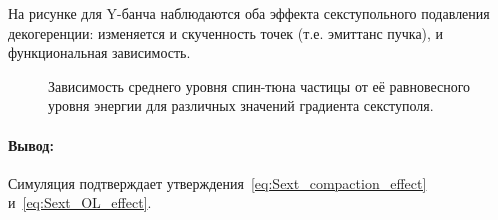 На рисунке для Y-банча наблюдаются оба эффекта секступольного подавления декогеренции: изменяется и скученность точек (т.е. эмиттанс пучка), и функциональная зависимость.

\begin{figure}[h]
	\centering
	\caption{Зависимость среднего уровня спин-тюна частицы от её равновесного уровня энергии для различных значений градиента секступоля.\label{fig:ST_vs_dkok_for_sext_strenghts}}
\end{figure}

\paragraph{Вывод:} Симуляция подтверждает утверждения~\eqref{eq:Sext_compaction_effect} и~\eqref{eq:Sext_OL_effect}.
